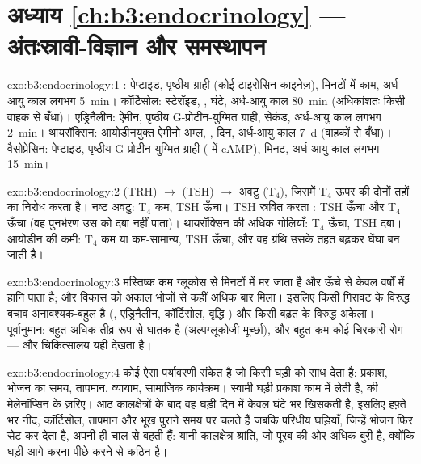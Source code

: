 \section*{अध्याय \ref{ch:b3:endocrinology} --- अंतःस्रावी-विज्ञान और समस्थापन}

\begin{solution}{exo:b3:endocrinology:1}
: पेप्टाइड, पृष्ठीय ग्राही (कोई टाइरोसिन काइनेज़), मिनटों में
काम, अर्ध-आयु काल लगभग \qty{5}{min}। कॉर्टिसोल: स्टेरॉइड, , घंटे, अर्ध-आयु काल \qty{80}{min} (अधिकांशतः किसी वाहक से बँधा)।
एड्रिनैलीन: ऐमीन, पृष्ठीय G-प्रोटीन-युग्मित ग्राही, सेकंड,
अर्ध-आयु काल लगभग \qty{2}{min}। थायरॉक्सिन: आयोडीनयुक्त ऐमीनो अम्ल,
, दिन, अर्ध-आयु काल \qty{7}{d} (वाहकों से बँधा)।
वैसोप्रेसिन: पेप्टाइड, पृष्ठीय G-प्रोटीन-युग्मित ग्राही (
में cAMP), मिनट, अर्ध-आयु काल लगभग \qty{15}{min}।
\end{solution}

\begin{solution}{exo:b3:endocrinology:2}
 (TRH) $\to$  (TSH) $\to$ अवटु (T$_{4}$), जिसमें
T$_{4}$ ऊपर की दोनों तहों का निरोध करता है। नष्ट अवटु: T$_{4}$ कम,
TSH ऊँचा। TSH स्रवित करता : TSH ऊँचा और T$_{4}$ ऊँचा (वह
पुनर्भरण उस  को दबा नहीं पाता)। थायरॉक्सिन की अधिक गोलियाँ:
T$_{4}$ ऊँचा, TSH दबा। आयोडीन की कमी: T$_{4}$ कम या
कम-सामान्य, TSH ऊँचा, और वह ग्रंथि उसके तहत बढ़कर घेंघा बन जाती है।
\end{solution}

\begin{solution}{exo:b3:endocrinology:3}
मस्तिष्क कम ग्लूकोस से मिनटों में मर जाता है और ऊँचे से केवल वर्षों में
हानि पाता है; और विकास को अकाल भोजों से कहीं अधिक बार मिला। इसलिए किसी
गिरावट के विरुद्ध बचाव अनावश्यक-बहुल है (, एड्रिनैलीन,
कॉर्टिसोल, वृद्धि ) और किसी बढ़त के विरुद्ध अकेला।
पूर्वानुमान: बहुत अधिक  तीव्र रूप से घातक है (अल्पग्लूकोजी
मूर्च्छा), और बहुत कम कोई चिरकारी रोग --- और चिकित्सालय यही देखता है।
\end{solution}

\begin{solution}{exo:b3:endocrinology:4}
 कोई ऐसा पर्यावरणी संकेत है जो किसी घड़ी को साध देता है: प्रकाश,
भोजन का समय, तापमान, व्यायाम, सामाजिक कार्यक्रम। स्वामी घड़ी प्रकाश काम
में लेती है,  की मेलेनॉप्सिन  के ज़रिए। आठ
कालक्षेत्रों के बाद वह घड़ी दिन में केवल घंटे भर खिसकती है, इसलिए
हफ़्ते भर नींद, कॉर्टिसोल, तापमान और भूख पुराने समय पर चलते हैं जबकि
परिधीय घड़ियाँ, जिन्हें भोजन फिर सेट कर देता है, अपनी ही चाल से बहती
हैं: यानी कालक्षेत्र-श्रांति, जो पूरब की ओर अधिक बुरी है, क्योंकि घड़ी
आगे करना पीछे करने से कठिन है।
\end{solution}

